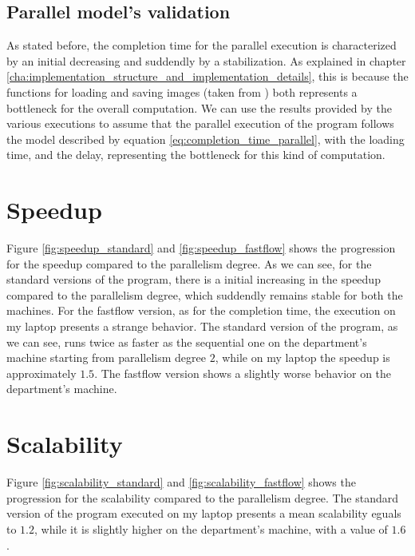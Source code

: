         \subsection{Parallel model's validation} %
        \label{sub:parallel_model_s_validation}
            As stated before, the completion time for the parallel execution is characterized by an initial
            decreasing and suddendly by a stabilization. As explained in chapter
            \ref{cha:implementation_structure_and_implementation_details}, this is because the functions for
            loading and saving images (taken from \cite{cimg}) both represents a bottleneck for
            the overall computation. We can use the results provided by the various executions to assume that
            the parallel execution of the program follows the model described by equation
            \ref{eq:completion_time_parallel}, with the loading time, and the delay, representing the
            bottleneck for this kind of computation.
    \section{Speedup} %
    \label{sec:speedup}
        Figure \ref{fig:speedup_standard} and \ref{fig:speedup_fastflow} shows the progression for the speedup
        compared to the parallelism degree. As we can see, for the standard versions of the program, there is a
        initial increasing in the speedup compared to the parallelism degree, which suddendly remains stable
        for both the machines. For the fastflow version, as for the completion time, the execution on my laptop
        presents a strange behavior. The standard version of the program, as we can see, runs twice as faster
        as the sequential one on the department's machine starting from parallelism degree $2$, while on my
        laptop the speedup is approximately $1.5$. The fastflow version shows a slightly worse behavior on the
        department's machine.
    \section{Scalability} %
    \label{sec:scalability}
        Figure \ref{fig:scalability_standard} and \ref{fig:scalability_fastflow} shows the progression for the
        scalability compared to the parallelism degree. The standard version of the program executed on my
        laptop presents a mean scalability eguals to $1.2$, while it is slightly higher on the department's
        machine, with a value of $1.6$.
